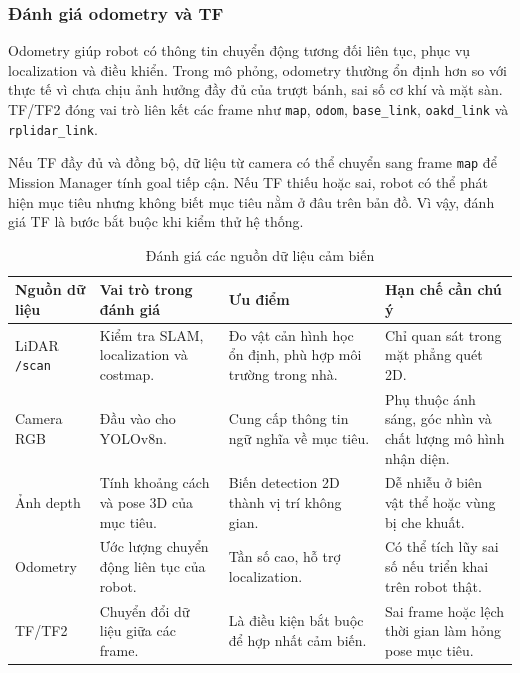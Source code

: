 \subsubsection{Đánh giá odometry và TF}
\label{subsubsec:odometry-tf-evaluation}

Odometry giúp robot có thông tin chuyển động tương đối liên tục, phục vụ localization và điều khiển. Trong mô phỏng, odometry thường ổn định hơn so với thực tế vì chưa chịu ảnh hưởng đầy đủ của trượt bánh, sai số cơ khí và mặt sàn. TF/TF2 đóng vai trò liên kết các frame như \texttt{map}, \texttt{odom}, \texttt{base\_link}, \texttt{oakd\_link} và \texttt{rplidar\_link}.

Nếu TF đầy đủ và đồng bộ, dữ liệu từ camera có thể chuyển sang frame \texttt{map} để Mission Manager tính goal tiếp cận. Nếu TF thiếu hoặc sai, robot có thể phát hiện mục tiêu nhưng không biết mục tiêu nằm ở đâu trên bản đồ. Vì vậy, đánh giá TF là bước bắt buộc khi kiểm thử hệ thống.

\begin{table}[H]
    \centering
    \caption{Đánh giá các nguồn dữ liệu cảm biến}
    \label{tab:sensor-evaluation}
    \renewcommand{\arraystretch}{1.25}
    \small
    \begin{tabularx}{\textwidth}{|>{\raggedright\arraybackslash}p{}|>{\raggedright\arraybackslash}p{}|>{\raggedright\arraybackslash}p{}|>{\raggedright\arraybackslash}X|}
        \hline
        \textbf{Nguồn dữ liệu} & \textbf{Vai trò trong đánh giá} & \textbf{Ưu điểm} & \textbf{Hạn chế cần chú ý} \\
        \hline
        LiDAR \texttt{/scan} & Kiểm tra SLAM, localization và costmap. & Đo vật cản hình học ổn định, phù hợp môi trường trong nhà. & Chỉ quan sát trong mặt phẳng quét 2D. \\
        \hline
        Camera RGB & Đầu vào cho YOLOv8n. & Cung cấp thông tin ngữ nghĩa về mục tiêu. & Phụ thuộc ánh sáng, góc nhìn và chất lượng mô hình nhận diện. \\
        \hline
        Ảnh depth & Tính khoảng cách và pose 3D của mục tiêu. & Biến detection 2D thành vị trí không gian. & Dễ nhiễu ở biên vật thể hoặc vùng bị che khuất. \\
        \hline
        Odometry & Ước lượng chuyển động liên tục của robot. & Tần số cao, hỗ trợ localization. & Có thể tích lũy sai số nếu triển khai trên robot thật. \\
        \hline
        TF/TF2 & Chuyển đổi dữ liệu giữa các frame. & Là điều kiện bắt buộc để hợp nhất cảm biến. & Sai frame hoặc lệch thời gian làm hỏng pose mục tiêu. \\
        \hline
    \end{tabularx}
\end{table}

